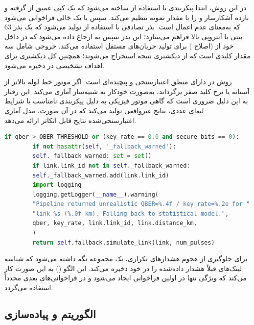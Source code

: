 در این روش، ابتدا پیکربندی با استفاده از  ساخته می‌شود که یک کپی عمیق از  گرفته و بازده آشکارساز  و  را با مقدار نمونه تنظیم می‌کند. سپس  با یک  خالی فراخوانی می‌شود که به‌معنای عدم اعمال  است. بذر تصادفی با استفاده از  تولید می‌شود که یک بذر $63$ بیتی با آنتروپی بالا فراهم می‌سازد؛ این بذر سپس به  ارجاع داده می‌شود که در داخل خود از  (اصلاح ) برای تولید جریان‌های مستقل  استفاده می‌کند. خروجی شامل سه مقدار کلیدی است که از دیکشنری نتیجه استخراج می‌شوند؛ همچنین کل دیکشنری برای اهداف تشخیصی در  ذخیره می‌شود.

روش  در  دارای منطق اعتبارسنجی و  پیچیده‌ای است. اگر موتور خط لوله  بالاتر از آستانه یا نرخ کلید صفر برگرداند، به‌صورت خودکار به شبیه‌ساز آماری  می‌کند. این رفتار به این دلیل ضروری است که گاهی موتور فیزیکی به دلیل پیکربندی نامناسب یا شرایط لبه‌ای عددی، نتایج غیرواقعی تولید می‌کند که در آن صورت، مدل آماری اعتبارسنجی‌شده نتایج قابل اتکاتر ارائه می‌دهد.

\begin{LTR}
	\begin{lstlisting}[language=Python]
		if qber > QBER_THRESHOLD or (key_rate == 0.0 and secure_bits == 0):
		if not hasattr(self, '_fallback_warned'):
		self._fallback_warned: set = set()
		if link.link_id not in self._fallback_warned:
		self._fallback_warned.add(link.link_id)
		import logging
		logging.getLogger(__name__).warning(
		"Pipeline returned unrealistic QBER=%.4f / key_rate=%.2e for "
		"link %s (%.0f km). Falling back to statistical model.",
		qber, key_rate, link.link_id, link.distance_km,
		)
		return self.fallback.simulate_link(link, num_pulses)
	\end{lstlisting}
\end{LTR}

برای جلوگیری از هجوم هشدارهای تکراری، یک مجموعه  نگه داشته می‌شود که شناسه لینک‌های قبلاً هشدار داده‌شده را در خود ذخیره می‌کند. این الگو () به این صورت کار می‌کند که ویژگی تنها در اولین فراخوانی ایجاد می‌شود و در فراخوانی‌های بعدی مجدداً استفاده می‌گردد.

\subsection{الگوریتم  و پیاده‌سازی }

